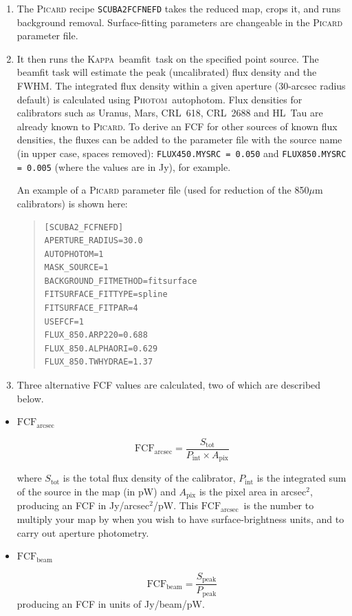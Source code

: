 \documentclass[twoside,11pt]{article}
\newcommand{\xref}[3]{#1}
\renewcommand{\_}{\texttt{\symbol{95}}}
\newenvironment{myquote}{\begin{quote}\begin{small}}{\end{small}\end{quote}}
\newcommand{\fcfb}{$\mathrm{FCF_{beam}}$}
\newcommand{\fcfa}{$\mathrm{FCF_{arcsec}}$}
\newcommand{\Kappa}{\xref{\textsc{Kappa}}{sun95}{}}
\newcommand{\photom}{\xref{\textsc{Photom}}{sun45}{}}
\newcommand{\picard}{\xref{\textsc{Picard}}{sun265}{}}
\newcommand{\drrecipe}[1]{\texttt{#1}}
\newcommand{\task}[1]{\textsf{#1}}
\newcommand{\beamfit}{\xref{\task{beamfit}}{sun95}{BEAMFIT}}
\newcommand{\autophotom}{\xref{\task{autophotom}}{sun45}{AUTOPHOTOM}}
\begin{document}
\begin{enumerate}
\item{The \textsc{Picard} recipe \drrecipe{SCUBA2\_FCFNEFD} takes the reduced
  map, crops it, and runs background removal. Surface-fitting
  parameters are changeable in the \textsc{Picard} parameter file.}
\item{It then runs the \Kappa\ \beamfit\ task on the specified point
  source. The \task{beamfit} task will estimate the peak (uncalibrated)
  flux density and the FWHM. The integrated flux density within a
  given aperture (30-arcsec radius default) is calculated using
  \photom\ \autophotom. Flux densities for calibrators such as Uranus,
  Mars, CRL~618, CRL~2688 and HL~Tau are already known to
  \picard. To derive an FCF for other sources of known flux densities,
  the fluxes can be added to the parameter file with the source name
  (in upper case, spaces removed): \texttt{FLUX\_450.MYSRC = 0.050}
  and \texttt{FLUX\_850.MYSRC = 0.005} (where the values are in Jy),
  for example. }

  An example of a \textsc{Picard} parameter file (used for reduction of the
  850$\mu$m calibrators) is shown here:

\begin{myquote}
\begin{verbatim}
[SCUBA2_FCFNEFD]
APERTURE_RADIUS=30.0
AUTOPHOTOM=1
MASK_SOURCE=1
BACKGROUND_FITMETHOD=fitsurface
FITSURFACE_FITTYPE=spline
FITSURFACE_FITPAR=4
USEFCF=1
FLUX_850.ARP220=0.688
FLUX_850.ALPHAORI=0.629
FLUX_850.TWHYDRAE=1.37
\end{verbatim}
\end{myquote}

\item {Three alternative FCF values are calculated, two of which are
described below.}
\end{enumerate}

\begin{itemize}

\item{\textbf{\fcfa}}

\begin{equation}
\label{eq:fcf_arcsec}
\mathrm{FCF_{arcsec}} = \frac{S_\mathrm{tot}}{P_\mathrm{int} \times
  A_\mathrm{pix}}
\end{equation}

where $S_\mathrm{tot}$ is the total flux density of the calibrator,
$P_\mathrm{int}$ is the integrated sum of the source in the map (in
pW) and $A_\mathrm{pix}$ is the pixel area in arcsec$^2$, producing an
FCF in Jy/arcsec$^2$/pW. This \fcfa\ is the number to
multiply your map by when you wish to have surface-brightness units,
and to carry out aperture photometry.

\item{\textbf{\fcfb}}

\begin{equation}
\label{eq:fcf_beam}
\mathrm{FCF_{beam}} = \frac{S_\mathrm{{peak}}}{P_\mathrm{peak}}
\end{equation}
producing an FCF in units of Jy/beam/pW.
\end{itemize}
\end{document}
